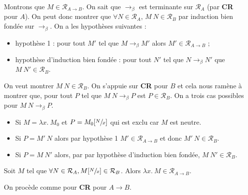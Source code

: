 \documentclass[./main]{subfiles}
\begin{document}
\begin{prv}
\begin{itemize}
\begin{description}
            Montrons que $M \in \mathcal{R}_{A \to B}$.
            On sait que $\to_\beta$ est terminante sur $\mathcal{R}_A$ (par \textbf{\textsf{CR}} pour $A$).
            On peut donc montrer que $\forall  N \in \mathcal{R}_A$, $M\: N \in \mathcal{R}_B$ par induction bien fondée sur $\to_\beta$.
            On a les hypothèses suivantes :
            \begin{itemize}
              \item hypothèse 1 :  pour tout $M'$ tel que $M \to_\beta M'$ alors $M' \in \mathcal{R}_{A \to B}$ ;
              \item hypothèse d'induction bien fondée :
                pour tout $N'$ tel que $N \to_\beta N'$ que $M\: N' \in \mathcal{R}_B$.
            \end{itemize}
            On veut montrer $M\: N \in \mathcal{R}_B$.
            On s'appuie sur \textbf{\textsf{CR}} pour $B$ et cela nous ramène à montrer que, pour tout $P$ tel que $M \: N \to_\beta P$ est $P \in \mathcal{R}_B$.
            On a trois cas possibles pour $M \: N \to_\beta P$.
            \begin{itemize}
              \item Si $M = \lambda x. \: M_0$ et  $P = M_0[\sfrac{N}{x}]$ qui est exclu car $M$ est neutre.
              \item Si $P = M'\: N$ alors par hypothèse 1 $M' \in \mathcal{R}_{A \to B}$ et donc $M'\: N \in \mathcal{R}_B$.
              \item Si $P = M \: N'$ alors, par par hypothèse d'induction bien fondée, $M \: N' \in \mathcal{R}_B$.
            \end{itemize}
        \end{description}
    \end{itemize}
  \end{prv}

  \begin{lem}
    Soit $M$ tel que $\forall N \in \mathcal{R}_A, M[\sfrac{N}{x}] \in \mathcal{R}_B$. Alors $\lambda x.\: M \in \mathcal{R}_{A \to B}$.
  \end{lem}
  \begin{prv}
    On procède comme pour \textbf{\textsf{CR}} pour $A \to B$.
  \end{prv}
\end{document}
